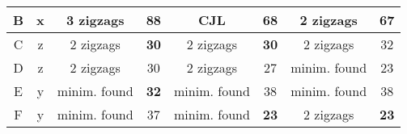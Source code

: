 \begin{table}[!h]
{\begin{tabular}{@{}|c|c|c|c|c|c|c|c|@{}}
			B                                                                                           & x                                    & 3 zigzags                                                        & 88                                                                     & CJL                                                               & 68                                                                     & 2 zigzags                                                        & \cellcolor[HTML]{34FF34}\textbf{67}                                    \\ \midrule
			C                                                                                           & z                                    & 2 zigzags                                                        & \cellcolor[HTML]{34FF34}\textbf{30}                                    & 2 zigzags                                                         & \cellcolor[HTML]{34FF34}\textbf{30}                                    & 2 zigzags                                                        & 32                                                                     \\ \midrule
			D                                                                                           & z                                    & 2 zigzags                                                        & 30                                                                     & 2 zigzags                                                         & 27                                                                     & minim. found                                                     & 23                                                                     \\ \midrule
			E                                                                                           & y                                    & minim. found                                                     & \cellcolor[HTML]{34FF34}\textbf{32}                                    & minim. found                                                      & 38                                                                     & minim. found                                                     & 38                                                                     \\ \midrule
			F                                                                                           & y                                    & minim. found                                                     & 37                                                                     & minim. found                                                      & \cellcolor[HTML]{34FF34}\textbf{23}                                    & 2 zigzags                                                        & \cellcolor[HTML]{34FF34}\textbf{23}                                    \\ \bottomrule




\end{tabular}}
\end{table}
